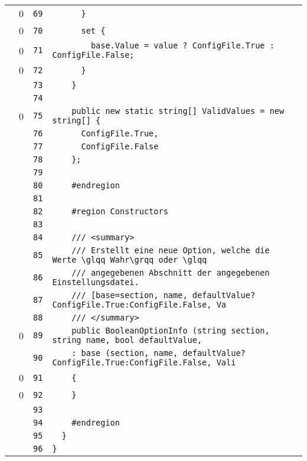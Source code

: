 \documentclass[a4paper,10pt]{article}
\begin{document}
\begin{longtable}[l]{lrrl}
\cellcolor{red} & 0 & \verb~69~ & \verb~      }~\\
\cellcolor{red} & 0 & \verb~70~ & \verb~      set {~\\
\cellcolor{red} & 0 & \verb~71~ & \verb~        base.Value = value ? ConfigFile.True : ConfigFile.False;~\\
\cellcolor{red} & 0 & \verb~72~ & \verb~      }~\\
\cellcolor{gray} &  & \verb~73~ & \verb~    }~\\
\cellcolor{gray} &  & \verb~74~ & \verb~~\\
\cellcolor{red} & 0 & \verb~75~ & \verb~    public new static string[] ValidValues = new string[] {~\\
\cellcolor{gray} &  & \verb~76~ & \verb~      ConfigFile.True,~\\
\cellcolor{gray} &  & \verb~77~ & \verb~      ConfigFile.False~\\
\cellcolor{gray} &  & \verb~78~ & \verb~    };~\\
\cellcolor{gray} &  & \verb~79~ & \verb~~\\
\cellcolor{gray} &  & \verb~80~ & \verb~    #endregion~\\
\cellcolor{gray} &  & \verb~81~ & \verb~~\\
\cellcolor{gray} &  & \verb~82~ & \verb~    #region Constructors~\\
\cellcolor{gray} &  & \verb~83~ & \verb~~\\
\cellcolor{gray} &  & \verb~84~ & \verb~    /// <summary>~\\
\cellcolor{gray} &  & \verb~85~ & \verb~    /// Erstellt eine neue Option, welche die Werte \glqq Wahr\grqq oder \glqq~\\
\cellcolor{gray} &  & \verb~86~ & \verb~    /// angegebenen Abschnitt der angegebenen Einstellungsdatei.~\\
\cellcolor{gray} &  & \verb~87~ & \verb~    /// [base=section, name, defaultValue?ConfigFile.True:ConfigFile.False, Va~\\
\cellcolor{gray} &  & \verb~88~ & \verb~    /// </summary>~\\
\cellcolor{red} & 0 & \verb~89~ & \verb~    public BooleanOptionInfo (string section, string name, bool defaultValue, ~\\
\cellcolor{gray} &  & \verb~90~ & \verb~    : base (section, name, defaultValue?ConfigFile.True:ConfigFile.False, Vali~\\
\cellcolor{red} & 0 & \verb~91~ & \verb~    {~\\
\cellcolor{red} & 0 & \verb~92~ & \verb~    }~\\
\cellcolor{gray} &  & \verb~93~ & \verb~~\\
\cellcolor{gray} &  & \verb~94~ & \verb~    #endregion~\\
\cellcolor{gray} &  & \verb~95~ & \verb~  }~\\
\cellcolor{gray} &  & \verb~96~ & \verb~}~\\
\end{longtable}
\newpage
\end{document}
